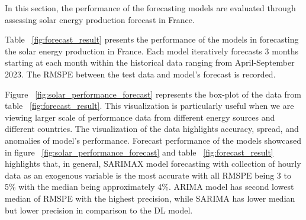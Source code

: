 \documentclass[acmtog]{acmart}
\begin{document}
In this section, the performance of the forecasting models are evaluated through assessing solar energy production forecast in France. 

Table ~\ref{fig:forecast_result} presents the performance of the models in forecasting the solar energy production in France. Each model iteratively forecasts 3 months starting at each month within the historical data ranging from April-September 2023. The RMSPE between the test data and model's forecast is recorded.
\begin{table}
    \centering
    \caption{RMSPE of solar energy quarterly forecast in France}
    \label{fig:forecast_result}
\end{table}
Figure ~\ref{fig:solar_performance_forecast} represents the box-plot of the data from table ~\ref{fig:forecast_result}. This visualization is particularly useful when we are viewing larger scale of performance data from different energy sources and different countries. The visualization of the data highlights accuracy, spread, and anomalies of model's performance. Forecast performance of the models showcased in figure ~\ref{fig:solar_performance_forecast} and table ~\ref{fig:forecast_result} highlights that, in general, SARIMAX model forecasting with collection of hourly data as an exogenous variable is the most accurate with all RMSPE being 3 to 5\% with the median being approximately 4\%. ARIMA model has second lowest median of RMSPE with the highest precision, while SARIMA has lower median but lower precision in comparison to the DL model.
\end{document}
